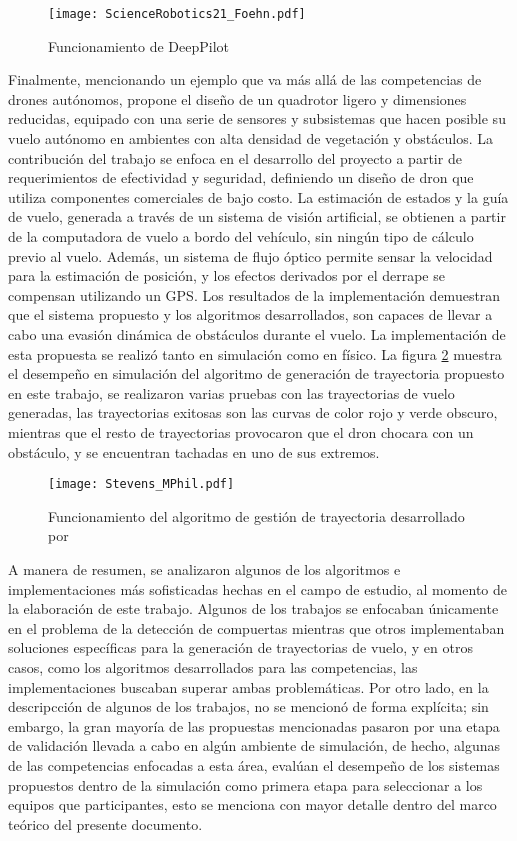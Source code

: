 \begin{figure}[ht]
    \centering
    \texttt{[image: ScienceRobotics21\_Foehn.pdf]}
    \caption{Funcionamiento de DeepPilot\citet{foehn2021time}}
    \label{fig:Foehn}
\end{figure}

Finalmente, mencionando un ejemplo que va más allá de las competencias de drones autónomos, \citet{stevens2021autonomous} propone el diseño de un quadrotor ligero y dimensiones reducidas, equipado con una serie de sensores y subsistemas que hacen posible su vuelo autónomo en ambientes con alta densidad de vegetación y obstáculos.  La contribución del trabajo se enfoca en el desarrollo del proyecto a partir de requerimientos de efectividad y seguridad, definiendo un diseño de dron que utiliza componentes comerciales de bajo costo. La estimación de estados y la guía de vuelo, generada a través de un sistema de visión artificial, se obtienen a partir de la computadora de vuelo a bordo del vehículo, sin ningún tipo de cálculo previo al vuelo. Además, un sistema de flujo óptico permite sensar la velocidad para la estimación de posición, y los efectos derivados por el derrape se compensan utilizando un GPS.
Los resultados de la implementación demuestran que el sistema propuesto y los algoritmos desarrollados, son capaces de llevar a cabo una evasión dinámica de obstáculos durante el vuelo. La implementación de esta propuesta se realizó tanto en simulación como en físico. La figura \ref{fig:Stevens} muestra el desempeño en simulación del algoritmo de generación de trayectoria propuesto en este trabajo, se realizaron varias pruebas con las trayectorias de vuelo generadas, las trayectorias exitosas son las curvas de color rojo y verde obscuro, mientras que el resto de trayectorias provocaron que el dron chocara con un obstáculo, y se encuentran tachadas en uno de sus extremos.


\begin{figure}[ht]
    \centering
    \texttt{[image: Stevens\_MPhil.pdf]}
    \caption{Funcionamiento del algoritmo de gestión de trayectoria desarrollado por \citet{stevens2021autonomous}}
    \label{fig:Stevens}
\end{figure}


A manera de resumen, se analizaron algunos de los algoritmos e implementaciones más sofisticadas hechas en el campo de estudio, al momento de la elaboración de este trabajo. Algunos de los trabajos se enfocaban únicamente en el problema de la detección de compuertas mientras que otros implementaban soluciones específicas para la generación de trayectorias de vuelo, y en otros casos, como los algoritmos desarrollados para las competencias, las implementaciones buscaban superar ambas problemáticas. Por otro lado, en la descripcción de algunos de los trabajos, no se mencionó de forma explícita; sin embargo, la gran mayoría de las propuestas mencionadas pasaron por una etapa de validación llevada a cabo en algún ambiente de simulación, de hecho, algunas de las competencias enfocadas a esta área, evalúan el desempeño de los sistemas propuestos dentro de la simulación como primera etapa para seleccionar a los equipos que participantes, esto se menciona con mayor detalle dentro del marco teórico del presente documento.

